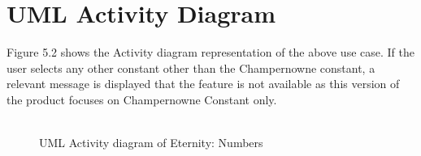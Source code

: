 \documentclass[12pt, a4paper]{report}
\begin{document}
\section{UML Activity Diagram}
Figure 5.2 shows the Activity diagram representation of the above use case. If the user selects any other constant other than the Champernowne constant, a relevant message is displayed that the feature is not available as this version of the product focuses on Champernowne Constant only.\\\\
\begin{figure}
    \centering
    \caption{UML Activity diagram of Eternity: Numbers}
    \label{fig:UML Activity diagram of Eternity: Numbers}
\end{figure}
\end{document}
